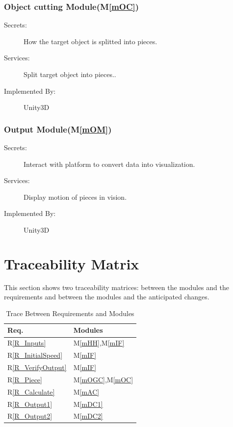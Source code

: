 \documentclass[12pt, titlepage]{article}
\newcommand{\rref}[1]{R\ref{#1}}
\newcommand{\mref}[1]{M\ref{#1}}
\begin{document}
	\subsubsection{Object cutting Module(\mref{mOC})}
	
	\begin{description}
		\item[Secrets:] How the target object is splitted into pieces.
		\item[Services:] Split target object into pieces..
		\item[Implemented By:] Unity3D
	\end{description}
	
	\subsubsection{Output Module(\mref{mOM})}
	
	\begin{description}
		\item[Secrets:] Interact with platform to convert data into visualization.
		\item[Services:] Display motion of pieces in vision.
		\item[Implemented By:] Unity3D
		\end{description}
	
	\section{Traceability Matrix} \label{SecTM}
	
	This section shows two traceability matrices: between the modules and the
	requirements and between the modules and the anticipated changes.
	
	\begin{table}[H]
		\centering
		\begin{tabular}{p{} p{}}
			\toprule
			\textbf{Req.} & \textbf{Modules}\\
			\midrule
			\rref{R_Inputs} & \mref{mHH},\mref{mIF}\\
			\rref{R_InitialSpeed} & \mref{mIF}\\
			\rref{R_VerifyOutput} & \mref{mIF}\\
			\rref{R_Piece} & \mref{mOGC},\mref{mOC}\\
			\rref{R_Calculate} & \mref{mAC}\\
			\rref{R_Output1} & \mref{mDC1}\\
			\rref{R_Output2} & \mref{mDC2}\\
			\bottomrule
		\end{tabular}
		\caption{Trace Between Requirements and Modules}
		\label{TblRT}
	\end{table}
	
\end{document}
